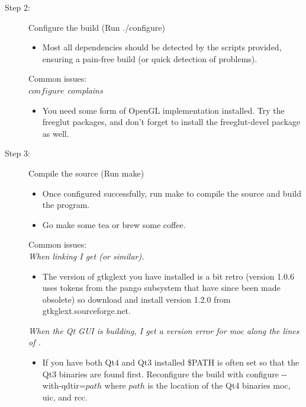 \begin{description}
	\item[Step 2:\its] Configure the build (Run {\sffamily./configure})
	\begin{itemize}
		\item Most all dependencies should be detected by the scripts provided, ensuring a pain-free build (or quick detection of problems).
	\end{itemize}
	Common issues:\\
	\emph{$configure$ complains }
	\begin{itemize}
		\item You need some form of OpenGL implementation installed. Try the freeglut packages, and don't forget to install the freeglut-devel package as well.
	\end{itemize}
\end{description}


\begin{description}
	\item[Step 3:\its] Compile the source (Run {\sffamily make})
	\begin{itemize}
		\item Once configured successfully, run {\sffamily make} to compile the source and build the program.
		\item Go make some tea or brew some coffee.
	\end{itemize}
	Common issues:\\
	\emph{When linking I get  (or similar).}
	\begin{itemize}
		\item The version of gtkglext you have installed is a bit retro (version 1.0.6 uses tokens from the pango subsystem that have since been made obsolete) so download and install version 1.2.0 from gtkglext.sourceforge.net.
	\end{itemize}
	\emph{When the Qt GUI is building, I get a version error for {\sffamily moc} along the lines of .}
	\begin{itemize}
		\item If you have both Qt4 and Qt3 installed \$PATH is often set so that the Qt3 binaries are found first. Reconfigure the build with {\sffamily configure {-}{-}with-qdtir=$path$} where $path$ is the location of the Qt4 binaries {\sffamily moc}, {\sffamily uic}, and {\sffamily rcc}.
	\end{itemize}

\end{description}

